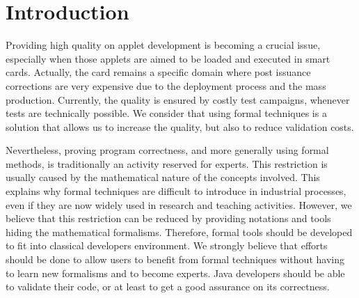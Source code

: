 \chapter{Introduction}
Providing high quality on applet development is becoming a crucial
issue, especially when those applets are aimed to be loaded and executed in smart cards.  Actually, the card
remains a specific domain where post issuance corrections are very expensive due to the deployment process and
the mass production. Currently, the quality is ensured by costly test campaigns, whenever tests are technically
possible. We consider that using formal techniques is a solution that allows us to increase the quality, but
also to reduce validation costs.

 Nevertheless, proving program correctness, and more generally using
formal methods, is traditionally an activity reserved for experts.  This restriction is usually caused by the
mathematical nature of the concepts involved.  This explains why formal techniques are difficult to introduce in
industrial processes, even if they are now widely used in research and teaching activities.  However, we believe
that this restriction can be reduced by providing notations and tools hiding the mathematical formalisms.
Therefore, formal tools should be developed to fit into classical developers environment.  We strongly believe
that efforts should be done to allow users to benefit from formal techniques without having to learn new
formalisms and to become experts. Java developers should be able to validate their code, or at least to get a
good assurance on its correctness.

